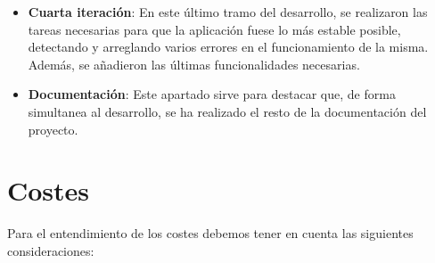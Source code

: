 \begin{itemize}
	\item \textbf{Cuarta iteración}: En este último tramo del desarrollo, se realizaron las tareas necesarias para que la aplicación fuese lo más estable posible, detectando y arreglando varios errores en el funcionamiento de la misma. Además, se añadieron las últimas funcionalidades necesarias.
	
	\item \textbf{Documentación}: Este apartado sirve para destacar que, de forma simultanea al desarrollo, se ha realizado el resto de la documentación del proyecto.
\end{itemize}

\section{Costes} \label{presupuesto}

Para el entendimiento de los costes debemos tener en cuenta las siguientes consideraciones:

